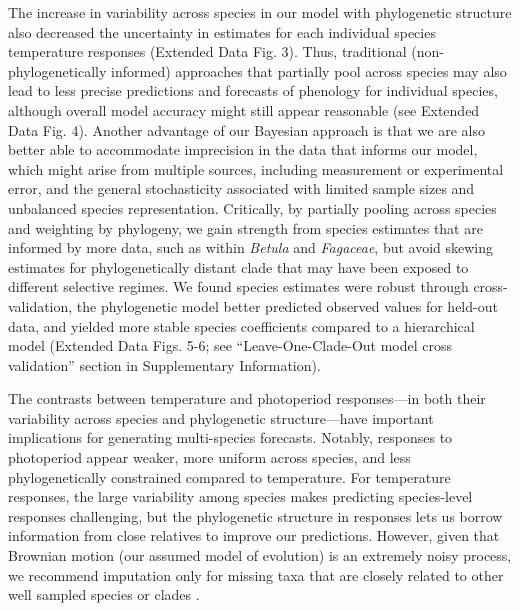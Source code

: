 \documentclass[11pt]{article}
\begin{document}
\par The increase in variability across species in our model with phylogenetic structure also decreased the uncertainty in estimates for each individual species temperature responses (Extended Data Fig. 3). Thus, traditional (non-phylogenetically informed) approaches that partially pool across species  \cite[most hierarchical models in ecology, e.g.,][]{flynn2018,ettinger2020} may also lead to less precise predictions and forecasts of phenology for individual species, although overall model accuracy might still appear reasonable (see Extended Data Fig. 4). Another advantage of our Bayesian approach is that we are also better able to accommodate imprecision in the data that informs our model, which might arise from multiple sources, including measurement or experimental error, and the general stochasticity associated with limited sample sizes and unbalanced species representation. Critically, by partially pooling across species and weighting by phylogeny, we gain strength from species estimates that are informed by more data, such as within \emph{Betula} and \emph{Fagaceae}, but avoid skewing estimates for phylogenetically distant clade that may have been exposed to different selective regimes. We found species estimates were robust through cross-validation, the phylogenetic model better predicted observed values for held-out data, and yielded more stable species coefficients compared to a hierarchical model (Extended Data Figs. 5-6; see ``Leave-One-Clade-Out model cross validation'' section in Supplementary Information). 

\par The contrasts between temperature and photoperiod responses---in both their variability across species and phylogenetic structure---have important implications for generating multi-species forecasts. Notably, responses to photoperiod appear weaker, more uniform across species, and less phylogenetically constrained compared to temperature. For temperature responses, the large variability among species makes predicting species-level  responses challenging, but the phylogenetic structure in responses lets us borrow information from close relatives to improve our predictions. However, given that Brownian motion (our assumed model of evolution) is an extremely noisy process, we recommend imputation only for missing taxa that are closely related to other well sampled species or clades \citep{molina2018assessing,molina2023unreliable}.
\end{document}
